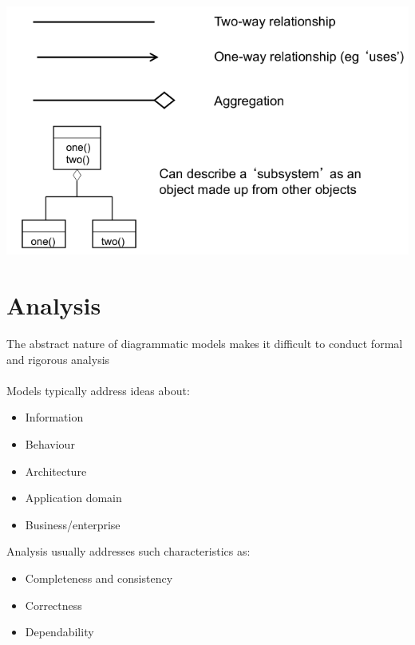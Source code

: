 \documentclass{article}[18pt]
\begin{document}
\begin{center}
	\includegraphics[scale=0.7]{arrows}
\end{center}
\section{Analysis}
The abstract nature of diagrammatic models makes it difficult to conduct formal and rigorous analysis\\
\\
Models typically address ideas about:
\begin{itemize}
	\item Information
	\item Behaviour
	\item Architecture
	\item Application domain
	\item Business/enterprise
\end{itemize}
Analysis usually addresses such characteristics as:
\begin{itemize}
	\item Completeness and consistency
	\item Correctness
	\item Dependability
\end{itemize}
\end{document}
